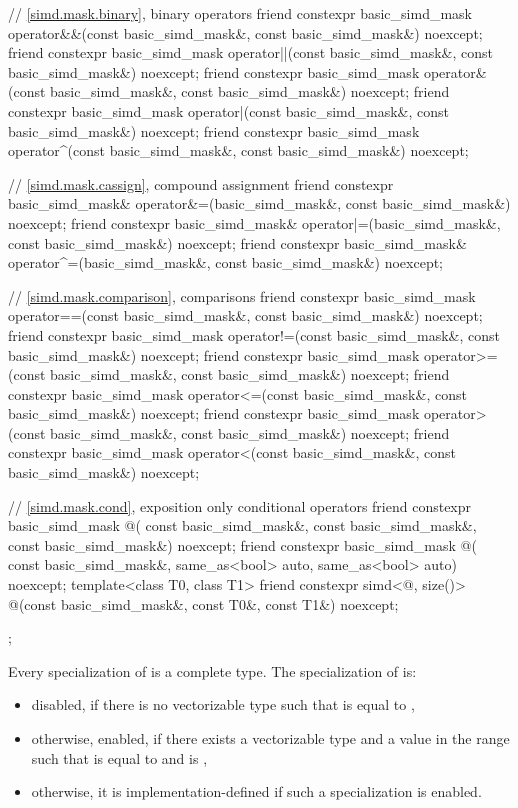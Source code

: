 \begin{codeblock}
{  // \ref{simd.mask.binary},  binary operators
  friend constexpr basic_simd_mask
    operator&&(const basic_simd_mask&, const basic_simd_mask&) noexcept;
  friend constexpr basic_simd_mask
    operator||(const basic_simd_mask&, const basic_simd_mask&) noexcept;
  friend constexpr basic_simd_mask
    operator&(const basic_simd_mask&, const basic_simd_mask&) noexcept;
  friend constexpr basic_simd_mask
    operator|(const basic_simd_mask&, const basic_simd_mask&) noexcept;
  friend constexpr basic_simd_mask
    operator^(const basic_simd_mask&, const basic_simd_mask&) noexcept;

  // \ref{simd.mask.cassign},  compound assignment
  friend constexpr basic_simd_mask&
    operator&=(basic_simd_mask&, const basic_simd_mask&) noexcept;
  friend constexpr basic_simd_mask&
    operator|=(basic_simd_mask&, const basic_simd_mask&) noexcept;
  friend constexpr basic_simd_mask&
    operator^=(basic_simd_mask&, const basic_simd_mask&) noexcept;

  // \ref{simd.mask.comparison},  comparisons
  friend constexpr basic_simd_mask
    operator==(const basic_simd_mask&, const basic_simd_mask&) noexcept;
  friend constexpr basic_simd_mask
    operator!=(const basic_simd_mask&, const basic_simd_mask&) noexcept;
  friend constexpr basic_simd_mask
    operator>=(const basic_simd_mask&, const basic_simd_mask&) noexcept;
  friend constexpr basic_simd_mask
    operator<=(const basic_simd_mask&, const basic_simd_mask&) noexcept;
  friend constexpr basic_simd_mask
    operator>(const basic_simd_mask&, const basic_simd_mask&) noexcept;
  friend constexpr basic_simd_mask
    operator<(const basic_simd_mask&, const basic_simd_mask&) noexcept;

  // \ref{simd.mask.cond},  exposition only conditional operators
  friend constexpr basic_simd_mask @\simdselect@(
    const basic_simd_mask&, const basic_simd_mask&, const basic_simd_mask&) noexcept;
  friend constexpr basic_simd_mask @\simdselect@(
    const basic_simd_mask&, same_as<bool> auto, same_as<bool> auto) noexcept;
  template<class T0, class T1>
    friend constexpr simd<@\seebelow@, size()>
      @\simdselect@(const basic_simd_mask&, const T0&, const T1&) noexcept;
};
\end{codeblock}

\pnum
Every specialization of  is a complete type.
The specialization of  is:
\begin{itemize}
  \item disabled, if there is no vectorizable type  such that  is
    equal to ,
  \item otherwise, enabled, if there exists a vectorizable type  and a value  in
    the range  such that  is equal to  and 
    is ,
  \item otherwise, it is implementation-defined if such a specialization is enabled.
\end{itemize}

